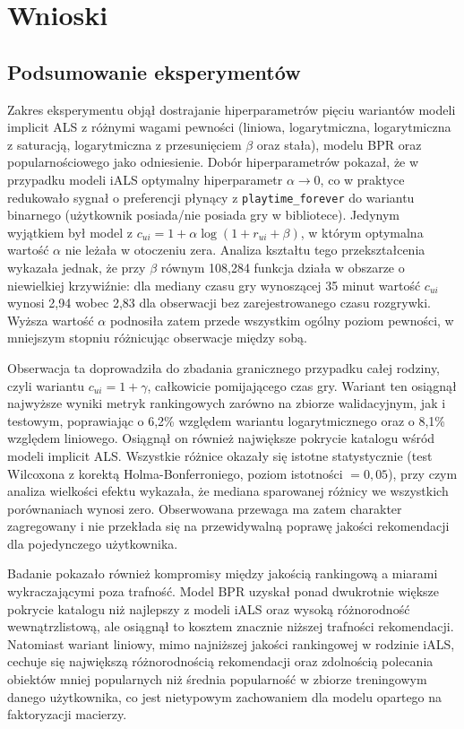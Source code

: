 \chapter{Wnioski}

\section{Podsumowanie eksperymentów}

Zakres eksperymentu objął dostrajanie hiperparametrów pięciu wariantów modeli implicit ALS z różnymi wagami pewności (liniowa, logarytmiczna, logarytmiczna z saturacją, logarytmiczna z przesunięciem $\beta$ oraz stała), modelu BPR oraz popularnościowego jako odniesienie. Dobór hiperparametrów pokazał, że w przypadku modeli iALS optymalny hiperparametr $\alpha \to 0$, co w praktyce redukowało sygnał o preferencji płynący z \texttt{playtime\_forever} do wariantu binarnego (użytkownik posiada/nie posiada gry w bibliotece). Jedynym wyjątkiem był model z $c_{ui} = 1 + \alpha \log(1 + r_{ui} + \beta)$, w którym optymalna wartość $\alpha$ nie leżała w otoczeniu zera. Analiza kształtu tego przekształcenia wykazała jednak, że przy $\beta$ równym 108,284 funkcja działa w obszarze o niewielkiej krzywiźnie: dla mediany czasu gry wynoszącej 35 minut wartość $c_{ui}$ wynosi 2,94 wobec 2,83 dla obserwacji bez zarejestrowanego czasu rozgrywki. Wyższa wartość $\alpha$ podnosiła zatem przede wszystkim ogólny poziom pewności, w mniejszym stopniu różnicując obserwacje między sobą.

Obserwacja ta doprowadziła do zbadania granicznego przypadku całej rodziny, czyli wariantu $c_{ui} = 1 + \gamma$, całkowicie pomijającego czas gry. Wariant ten osiągnął najwyższe wyniki metryk rankingowych zarówno na zbiorze walidacyjnym, jak i testowym, poprawiając \ndcg{} o 6,2\% względem wariantu logarytmicznego oraz o 8,1\% względem liniowego. Osiągnął on również największe pokrycie katalogu wśród modeli implicit ALS. Wszystkie różnice okazały się istotne statystycznie (test Wilcoxona z korektą Holma-Bonferroniego, poziom istotności $= 0{,}05$), przy czym analiza wielkości efektu wykazała, że mediana sparowanej różnicy \ndcg{} we wszystkich porównaniach wynosi zero. Obserwowana przewaga ma zatem charakter zagregowany i nie przekłada się na przewidywalną poprawę jakości rekomendacji dla pojedynczego użytkownika.

Badanie pokazało również kompromisy między jakością rankingową a miarami wykraczającymi poza trafność. Model BPR uzyskał ponad dwukrotnie większe pokrycie katalogu niż najlepszy z modeli iALS oraz wysoką różnorodność wewnątrzlistową, ale osiągnął to kosztem znacznie niższej trafności rekomendacji. Natomiast wariant liniowy, mimo najniższej jakości rankingowej w rodzinie iALS, cechuje się największą różnorodnością rekomendacji oraz zdolnością polecania obiektów mniej popularnych niż średnia popularność w zbiorze treningowym danego użytkownika, co jest nietypowym zachowaniem dla modelu opartego na faktoryzacji macierzy.

